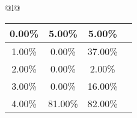 \begin{longtable}{@{}l@{}}
\begin{minipage}{\textwidth}
\begin{tabular}{|c|c|c|c|}
0.00\% & 5.00\% & 5.00\% & \textcolor{red}{\ding{55}} \\ \hline
1.00\% & 0.00\% & 37.00\% & \textcolor{green}{\ding{51}} \\ \hline
2.00\% & 0.00\% & 2.00\% & \textcolor{green}{\ding{51}} \\ \hline
3.00\% & 0.00\% & 16.00\% & \textcolor{green}{\ding{51}} \\ \hline
4.00\% & 81.00\% & 82.00\% & \textcolor{green}{\ding{51}} \\ \hline
\end{tabular}
\end{minipage}\\[2ex]
\end{longtable}